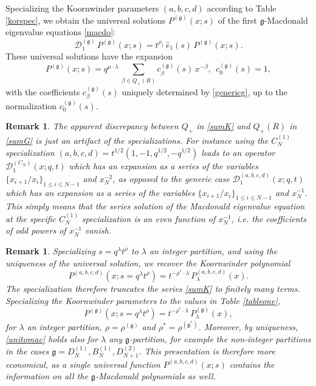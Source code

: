 \documentclass[12pt]{amsart}
\newtheorem{remark}[thm]{Remark}
\newcommand{\g}{{\mathfrak{g}}}
\newcommand{\D}{{\mathcal{D}}}
\numberwithin{equation}{section}
\begin{document}
Specializing the Koornwinder parameters $(a,b,c,d)$ according to Table \ref{korspec}, 
we obtain the universal solutions
$P^{(\g)}(x;s)$ of the first $\g$-Macdonald eigenvalue equations \eqref{macdo}:
\begin{equation}\label{genericg}
{\mathcal D}_1^{(\g)}\, P^{(\g)}(x;s)=t^{\rho_1}\,\hat e_1(s)\, P^{(\g)}(x;s).
\end{equation}
These universal solutions have the expansion
\begin{equation}\label{sumG} P^{(\g)}(x;s)=q^{\mu\cdot \lambda}\, \sum_{\beta\in Q_+(R)} c_\beta^{(\g)}(s) \, x^{-\beta},\ \ 
c_0^{(\g)}(s)=1,
\end{equation}
with the coefficients $c_\beta^{(\g)}(s)$ uniquely determined by \eqref{genericg}, up to the normalization $c_0^{(\g)}(s)$.


\begin{remark}
The apparent discrepancy between $Q_+$
in \eqref{sumK} and $Q_+(R)$ in \eqref{sumG} is just an artifact of the specializations. 
For instance using the $C_N^{(1)}$ specialization $(a,b,c,d)=t^{1/2}(1,-1,q^{1/2},-q^{1/2})$
leads to an operator $\D_1^{(C_N)}(x;q,t)$ which has an expansion as a series of the variables $\{x_{i+1}/x_i\}_{1\leq i\leq N-1}$ and $x_N^{-2}$, as opposed to
the generic case $\D_1^{(a,b,c,d)}(x;q,t)$ which has an expansion as a series of the variables $\{x_{i+1}/x_i\}_{1\leq i\leq N-1}$ and $x_N^{-1}$. This simply means that the series solution of the Macdonald eigenvalue equation at the specific $C_N^{(1)}$ specialization is an {\it even} function of $x_N^{-1}$, i.e. the coefficients of odd powers of $x_N^{-1}$ vanish.
\end{remark}

\begin{remark}\label{accessrem}
Specializing $s=q^\lambda t^\rho$ to $\lambda$ an integer partition, and using the uniqueness of the universal solution, we recover
the Koornwinder polynomial
\begin{equation}\label{unitokorc} 
P^{(a,b,c,d)}(x;s=q^\lambda t^\rho)=t^{-\rho^* \cdot\lambda}\, P_\lambda^{(a,b,c,d)}(x).
\end{equation}
The specialization therefore truncates the series \eqref{sumK} to finitely many terms.
Specializing the Koornwinder parameters to the values in Table \ref{tableone},
\begin{equation}\label{unitomac} 
P^{(\g)}(x;s=q^\lambda t^{\rho})= t^{-\rho^* \cdot\lambda}\, P_\lambda^{(\g)}(x),
\end{equation}
for $\lambda$ an integer partition, $\rho=\rho^{(\g)}$ and $\rho^*=\rho^{(\g^*)}$. Moreover, by uniqueness,
\eqref{unitomac} holds also for $\lambda$ any $\g$-partition, for example the non-integer partitions in the cases $\g=D_N^{(1)},B_N^{(1)},D_{N+1}^{(2)}$.
%
%
%
This presentation is therefore more economical, as a {\it single} universal function $P^{(a,b,c,d)}(x;s)$
contains the information on {\it all} the $\g$-Macdonald polynomials as well.
\end{remark}
\end{document}
